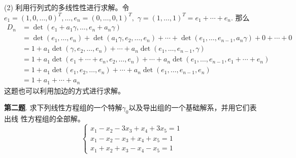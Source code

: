(2) 利用行列式的多线性性进行求解。令$e_1 = (1, 0, \ldots, 0)^T, \ldots, e_n = (0, \ldots, 0, 1)^T,$ $\gamma = (1, \ldots, 1)^T = e_1 + \cdots + e_n.$ 那么
\begin{align*}
D_n & = \det( e_1 + a_1 \gamma, \ldots, e_n + a_n \gamma) \\
& = \det( e_1, \ldots, e_n) + \det( a_1 \gamma, e_2, \ldots, e_n) + \cdots + \det( e_1, \ldots, e_{n-1}, a_n \gamma) + 0 + \cdots + 0 \\
& = 1 + a_1 \det( \gamma, e_2, \ldots, e_n) + \cdots + a_n \det( e_1, \ldots, e_{n-1}, \gamma) \\
& = 1 + a_1 \det( e_1 + \cdots + e_n, e_2, \ldots, e_n) + \cdots + a_n \det( e_1, \ldots, e_{n-1}, e_1 + \cdots + e_n) \\
& = 1 + a_1 \det( e_1, e_2, \ldots, e_n) + \cdots + a_n \det( e_1, \ldots, e_{n-1}, e_n) \\
& = 1 + a_1 + \cdots + a_n
\end{align*}
这题也可以利用加边的方式进行求解。

\newpageorvspace

{\bf 第二题}. 求下列线性方程组的一个特解$\gamma_0$以及导出组的一个基础解系，并用它们表出线
性方程组的全部解。
$$
\begin{cases}
x_1 - x_2 - 3 x_3 + x_4 + 3 x_5 = 1 \\
x_1 - x_2 - x_3 + x_4 + x_5 = 1 \\
x_1 + x_2 + x_3 - x_4 - x_5 = 1
\end{cases}
$$

\newpageorvspace

